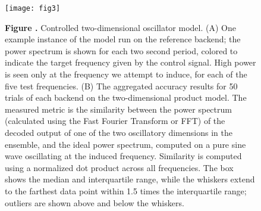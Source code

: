 \documentclass{frontiersSCNS}
\providecommand{\DIFaddbeginFL}{} %
\providecommand{\DIFaddendFL}{} %
\providecommand{\DIFdelbeginFL}{} %
\providecommand{\DIFdelendFL}{} %
\begin{document}
\begin{figure}[!ht]
\begin{center}
  \DIFdelbeginFL %
\DIFdelendFL \DIFaddbeginFL \texttt{[image: fig3]}
\DIFaddendFL \end{center}
\textbf{\label{fig:03} Figure .}
       {Controlled two-dimensional oscillator model. (A) One example
         instance of the model run on the reference backend;
         the power spectrum is shown for each two second period,
         colored to indicate the target frequency given by the control signal.
         High power is seen only at the frequency we attempt to induce,
         for each of the five test frequencies.
         (B) The aggregated accuracy results for 50 trials of
         each backend on the
         two-dimensional product model. The measured metric is the similarity
         between the power spectrum (calculated using the Fast Fourier
         Transform or FFT) of the decoded output of one of the two oscillatory
         dimensions in the ensemble, and the ideal power spectrum,
         computed on a pure sine wave oscillating at the induced frequency.
         Similarity is computed using a normalized dot product across
         all frequencies. The box shows the median and
         interquartile range, while the whiskers extend to the farthest
         data point within 1.5 times the interquartile range;
         outliers are shown above and below the whiskers.}
\end{figure}
\end{document}
